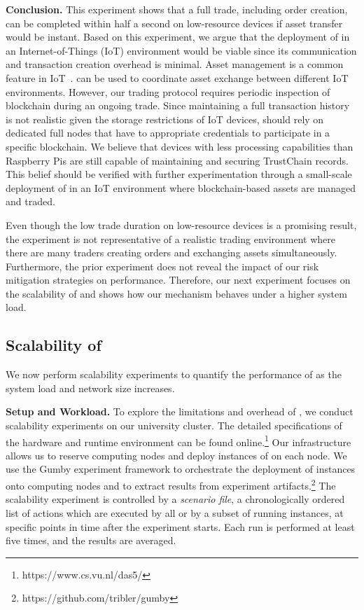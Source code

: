 \textbf{Conclusion.}
This experiment shows that a full trade, including order creation, can be completed within half a second on low-resource devices if asset transfer would be instant.
Based on this experiment, we argue that the deployment of \ModelName{} in an Internet-of-Things (IoT) environment would be viable since its communication and transaction creation overhead is minimal.
Asset management is a common feature in IoT~\cite{gilchrist2016industry}.
\ModelName{} can be used to coordinate asset exchange between different IoT environments.
However, our trading protocol requires periodic inspection of blockchain during an ongoing trade.
Since maintaining a full transaction history is not realistic given the storage restrictions of IoT devices, \ModelName{} should rely on dedicated full nodes that have to appropriate credentials to participate in a specific blockchain.
We believe that devices with less processing capabilities than Raspberry Pis are still capable of maintaining and securing TrustChain records.
This belief should be verified with further experimentation through a small-scale deployment of \ModelName{} in an IoT environment where blockchain-based assets are managed and traded.

Even though the low trade duration on low-resource devices is a promising result, the experiment is not representative of a realistic trading environment where there are many traders creating orders and exchanging assets simultaneously.
Furthermore, the prior experiment does not reveal the impact of our risk mitigation strategies on performance.
Therefore, our next experiment focuses on the scalability of \ModelName{} and shows how our mechanism behaves under a higher system load.

\subsection{Scalability of \ModelName{}}
\label{subsec:scalability_experiment}
We now perform scalability experiments to quantify the performance of \ModelName{} as the system load and network size increases.

\textbf{Setup and Workload.}
To explore the limitations and overhead of \ModelName{}, we conduct scalability experiments on our university cluster.
The detailed specifications of the hardware and runtime environment can be found online.\footnote{https://www.cs.vu.nl/das5/}
Our infrastructure allows us to reserve computing nodes and deploy instances of \ModelName{} on each node.
We use the Gumby experiment framework to orchestrate the deployment of \ModelName{} instances onto computing nodes and to extract results from experiment artifacts.\footnote{https://github.com/tribler/gumby}
The scalability experiment is controlled by a \emph{scenario file}, a chronologically ordered list of actions which are executed by all or by a subset of running instances, at specific points in time after the experiment starts.
Each run is performed at least five times, and the results are averaged.

